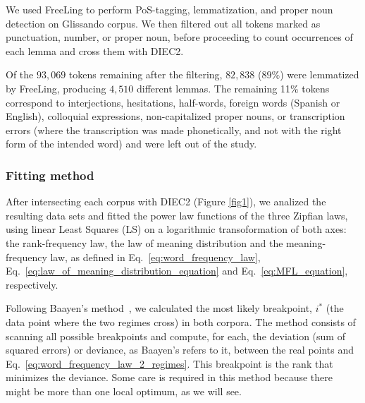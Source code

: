 \documentclass[10pt,letterpaper]{article}
\begin{document}
We used FreeLing \cite{Padro2012} to perform PoS-tagging, lemmatization, and proper noun detection on Glissando corpus. We then filtered out all tokens marked as punctuation, number, or proper noun, before proceeding to count occurrences of each lemma and cross them with DIEC2. 

Of the $93,069$ tokens remaining after the filtering, $82,838$ ($89\%$) were lemmatized by FreeLing, producing $4,510$ different lemmas. The remaining 11\% tokens correspond to interjections, hesitations, half-words, foreign words (Spanish or English), colloquial expressions, non-capitalized proper nouns, or transcription errors (where the transcription was made phonetically, and not with the right form of the intended word) and were left out of the study.

\subsubsection*{Fitting method}

After intersecting each corpus with DIEC2 (Figure \ref{fig1}), we analized the resulting data sets and fitted the power law functions of the three Zipfian laws, using linear Least Squares (LS) on a logarithmic transoformation of both axes: the rank-frequency law, the law of meaning distribution and the meaning-frequency law, as
defined in Eq.~\ref{eq:word_frequency_law}, Eq.~\ref{eq:law_of_meaning_distribution_equation} and Eq.~\ref{eq:MFL_equation}, respectively. 

Following Baayen's method~\cite{baayen2008ald}, we calculated the most likely breakpoint, $i^*$ (the data point where the two regimes cross) in both corpora. The method consists of scanning all possible breakpoints and compute, for each, the deviation (sum of squared errors) or deviance, as Baayen's refers to it, between the real points and Eq.~\ref{eq:word_frequency_law_2_regimes}.
This breakpoint is the rank that minimizes the deviance. Some care is required in this method because there might be more than one local optimum, as we will see. 
\end{document}
